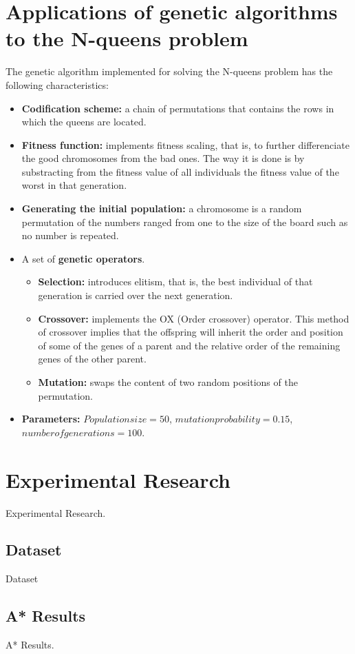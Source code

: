 \documentclass[11pt]{llncs}
\begin{document}
\section{Applications of genetic algorithms to the N-queens problem}\label{gen_nqueens}
The genetic algorithm implemented for solving the N-queens problem has the following characteristics:
\begin{itemize}
    \item \textbf{Codification scheme:} a chain of permutations that contains the rows in which the queens are located.
    \item \textbf{Fitness function:} implements fitness scaling, that is, to further differenciate the good chromosomes from the bad ones. The way it is done is by substracting from the fitness value of all individuals the fitness value of the worst in that generation. 
    \item \textbf{Generating the initial population:} a chromosome is a random permutation of the numbers ranged from one to the size of the board such as no number is repeated.
    \item A set of \textbf{genetic operators}. 
    \begin{itemize}
        \item \textbf{Selection:} introduces elitism, that is, the best individual of that generation is carried over the next generation.
        \item \textbf{Crossover:} implements the OX (Order crossover) operator. This method of crossover implies that the offspring will inherit the order and position of some of the genes of a parent and the relative order of the remaining genes of the other parent.
        \item \textbf{Mutation:} swaps the content of two random positions of the permutation.
    \end{itemize}
    \item \textbf{Parameters:} $Population size = 50$, $mutation probability = 0.15$, $number of generations = 100$.
\end{itemize}
\section{Experimental Research}\label{exp_research}
Experimental Research.
\subsection{Dataset}\label{dataset}
Dataset
\subsection{A* Results}\label{astar_results}
A* Results.
\end{document}
